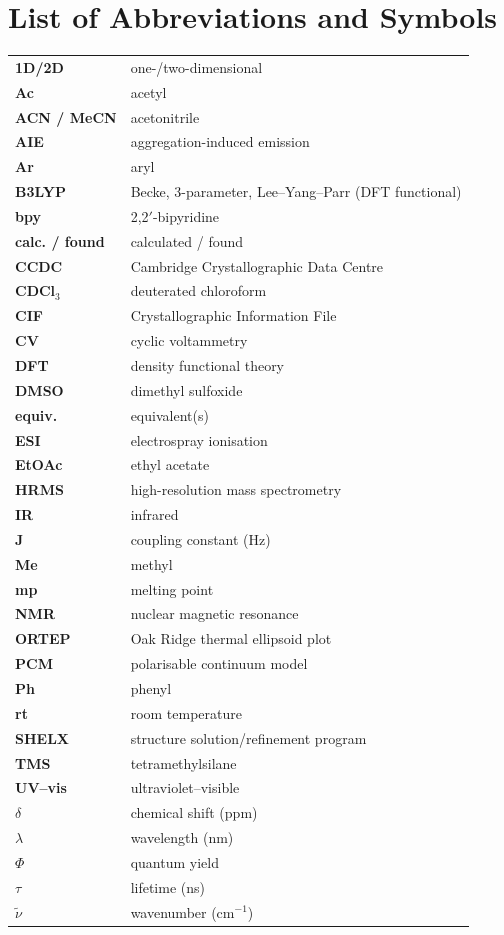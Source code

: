 \chapter*{List of Abbreviations and Symbols}
\begin{tabular}{ll}
\textbf{1D/2D} & one-/two-dimensional \\
\textbf{Ac} & acetyl \\
\textbf{ACN / MeCN} & acetonitrile \\
\textbf{AIE} & aggregation-induced emission \\
\textbf{Ar} & aryl \\
\textbf{B3LYP} & Becke, 3-parameter, Lee--Yang--Parr (DFT functional) \\
\textbf{bpy} & 2,2$'$-bipyridine \\
\textbf{calc. / found} & calculated / found \\
\textbf{CCDC} & Cambridge Crystallographic Data Centre \\
\textbf{CDCl$_3$} & deuterated chloroform \\
\textbf{CIF} & Crystallographic Information File \\
\textbf{CV} & cyclic voltammetry \\
\textbf{DFT} & density functional theory \\
\textbf{DMSO} & dimethyl sulfoxide \\
\textbf{equiv.} & equivalent(s) \\
\textbf{ESI} & electrospray ionisation \\
\textbf{EtOAc} & ethyl acetate \\
\textbf{HRMS} & high-resolution mass spectrometry \\
\textbf{IR} & infrared \\
\textbf{J} & coupling constant (Hz) \\
\textbf{Me} & methyl \\
\textbf{mp} & melting point \\
\textbf{NMR} & nuclear magnetic resonance \\
\textbf{ORTEP} & Oak Ridge thermal ellipsoid plot \\
\textbf{PCM} & polarisable continuum model \\
\textbf{Ph} & phenyl \\
\textbf{rt} & room temperature \\
\textbf{SHELX} & structure solution/refinement program \\
\textbf{TMS} & tetramethylsilane \\
\textbf{UV--vis} & ultraviolet--visible \\
$\delta$ & chemical shift (ppm) \\
$\lambda$ & wavelength (nm) \\
$\Phi$ & quantum yield \\
$\tau$ & lifetime (ns) \\
$\tilde{\nu}$ & wavenumber (cm$^{-1}$) \\
\end{tabular}
